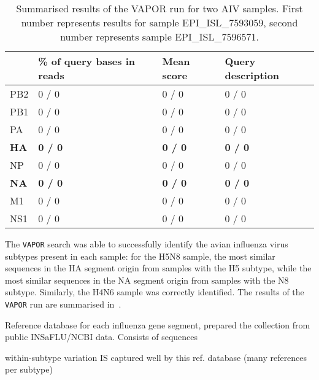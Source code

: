 \setlength{\tabcolsep}{10pt}
\begin{table}[]
    \begin{tabular}{@{}llll@{}}
    \toprule
                & \textbf{\% of query bases in reads} & \textbf{Mean score} & \textbf{Query description} \\ \midrule
    PB2         & 0 / 0                               & 0 / 0               & 0 / 0                      \\
    PB1         & 0 / 0                               & 0 / 0               & 0 / 0                      \\
    PA          & 0 / 0                               & 0 / 0               & 0 / 0                      \\
    \textbf{HA} & \textbf{0 / 0}                      & \textbf{0 / 0}      & \textbf{0 / 0}             \\
    NP          & 0 / 0                               & 0 / 0               & 0 / 0                      \\
    \textbf{NA} & \textbf{0 / 0}                      & \textbf{0 / 0}      & \textbf{0 / 0}             \\
    M1          & 0 / 0                               & 0 / 0               & 0 / 0                      \\
    NS1         & 0 / 0                               & 0 / 0               & 0 / 0                      \\ \bottomrule
    \end{tabular}
    \caption{Summarised results of the VAPOR run for two AIV samples. First number represents results for sample EPI\_ISL\_7593059, second number represents sample EPI\_ISL\_7596571.}
\label{tab:4-aiv-vapor}
\end{table}

The \texttt{VAPOR} search was able to successfully identify the avian influenza virus subtypes present in each sample: for the H5N8 sample, the  most similar sequences in the HA segment origin from samples with the H5 subtype, while the  most similar sequences in the NA segment origin from samples with the N8 subtype. Similarly, the H4N6 sample was correctly identified. The results of the \texttt{VAPOR} run are summarised in~.

\todoit
Reference database for each influenza gene segment, prepared the collection from public INSaFLU/NCBI data. Consists of  sequences

within-subtype variation IS captured well by this ref. database (many references per subtype)

